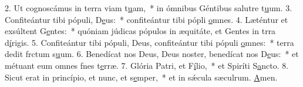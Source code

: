 2. Ut cognoscámus in terra viam t\uline{u}am,~* in ómnibus Géntibus salutre t\uline{u}um.
3. Confiteántur tibi pópuli, D\uline{e}us:~* confiteántur tibi pópli \uline{o}mnes.
4. Læténtur et exsúltent G\uline{e}ntes:~* quóniam júdicas pópulos in æquitáte, et Gentes in trra d\uline{í}rigis.
5. Confiteántur tibi pópuli, Deus, confiteántur tibi pópuli \uline{o}mnes:~* terra dedit frctum s\uline{u}um.
6. Benedícat nos Deus, Deus noster, benedícat nos D\uline{e}us:~* et métuant eum omnes fnes t\uline{e}rræ.
7. Glória Patri, et F\uline{í}lio,~* et Spiríti S\uline{a}ncto.
8. Sicut erat in princípio, et nunc, et s\uline{e}mper,~* et in sǽcula sæculrum. \uline{A}men.
